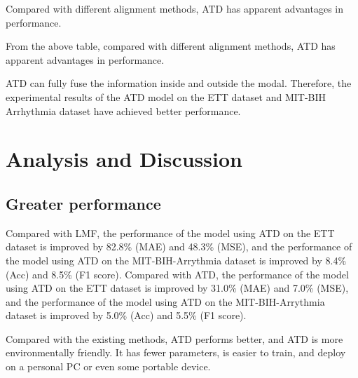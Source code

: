 \documentclass{ecai}
\begin{document}
Compared with different alignment methods, ATD has apparent advantages in performance.

From the above table, compared with different alignment methods, ATD has apparent advantages in performance. 

ATD can fully fuse the information inside and outside the modal. Therefore, the experimental results of the ATD model on the ETT dataset and MIT-BIH Arrhythmia dataset have achieved better performance.



\section{Analysis and Discussion}
\subsection{Greater performance}
Compared with LMF, the performance of the model using ATD on the ETT dataset is improved by 82.8\% (MAE) and 48.3\% (MSE), and the performance of the model using ATD on the MIT-BIH-Arrythmia dataset is improved by 8.4\% (Acc) and 8.5\% (F1 score). Compared with ATD, the performance of the model using ATD on the ETT dataset is improved by 31.0\% (MAE) and 7.0\% (MSE), and the performance of the model using ATD on the MIT-BIH-Arrythmia dataset is improved by 5.0\% (Acc) and 5.5\% (F1 score).

Compared with the existing methods, ATD performs better, and ATD is more environmentally friendly. It has fewer parameters, is easier to train, and deploy on a personal PC or even some portable device.
\end{document}
